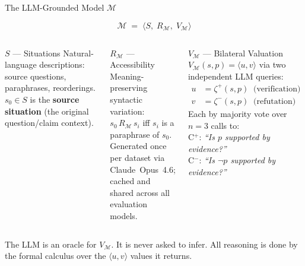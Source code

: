 \documentclass[aspectratio=169,9pt]{beamer}
\newcommand{\tv}[2]{\langle #1,#2 \rangle}
\begin{document}
\begin{frame}{The LLM-Grounded Model $\mathcal{M}$}

  \[
    \mathcal{M} \;=\; \langle S,\; R_\mathcal{M},\; V_\mathcal{M} \rangle
  \]

  \begin{columns}[T]
    \begin{block}{$S$ — Situations}
      Natural-language descriptions: source questions, paraphrases, reorderings.
      $s_0 \in S$ is the \textbf{source situation} (the original question/claim context).
    \end{block}

    \medskip

    \begin{block}{$R_\mathcal{M}$ — Accessibility}
      Meaning-preserving syntactic variation:\\
      $s_0\, R_\mathcal{M}\, s_i$ iff $s_i$ is a paraphrase of $s_0$.\\[2pt]
      \small Generated once per dataset via Claude~Opus~4.6; cached and shared across all evaluation models.
    \end{block}

    \begin{block}{$V_\mathcal{M}$ — Bilateral Valuation}
      $V_\mathcal{M}(s, p) = \tv{u}{v}$ via two independent LLM queries:
      \begin{align*}
        u &= \zeta^+(s,p) \;\; \text{(verification)} \\
        v &= \zeta^-(s,p) \;\; \text{(refutation)}
      \end{align*}
      \small Each by majority vote over $n=3$ calls to:\\
      C$^+$: \textit{``Is $p$ supported by evidence?''}\\
      C$^-$: \textit{``Is $\neg p$ supported by evidence?''}
    \end{block}
  \end{columns}

  \bigskip
  \small
  The LLM is an oracle for $V_\mathcal{M}$. It is never asked to infer.
  All reasoning is done by the formal calculus over the $\tv{u}{v}$ values it returns.

\end{frame}
\end{document}
